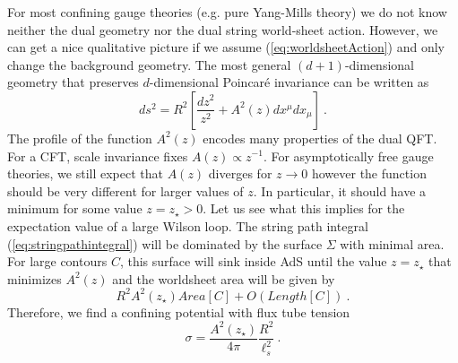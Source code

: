 \documentclass{ws-rv9x6}
\newcommand\be{\begin{equation}}
\newcommand\ee{\end{equation}}
\begin{document}
For most confining gauge theories (e.g. pure Yang-Mills theory) we
do not know neither the dual geometry nor the dual string world-sheet
action. However, we can get a nice qualitative picture if we assume
(\ref{eq:worldsheetAction}) and only change the background geometry.
The most general $(d+1)$-dimensional geometry that preserves $d$-dimensional
Poincaré invariance can be written as
\begin{equation}
ds^{2}=R^{2}\left[\frac{dz^{2}}{z^{2}}+A^{2}(z)dx^{\mu}dx_{\mu}\right]\ .\label{eq:confininggeometry}
\end{equation}
The profile of the function $A^{2}(z)$ encodes many properties of
the dual QFT. For a CFT, scale invariance fixes $A(z)\propto z^{-1}$.
For asymptotically free gauge theories, we still expect that $A(z)$
diverges for $z\to0$ however the function should be very different
for larger values of $z$. In particular, it should have a minimum
for some value $z=z_{\star}>0$. Let us see what this implies for
the expectation value of a large Wilson loop. The string path integral
(\ref{eq:stringpathintegral}) will be dominated by the surface $\Sigma$
with minimal area. For large contours $C$, this surface will sink
inside AdS until the value $z=z_{\star}$ that minimizes $A^{2}(z)$
and the worldsheet area will be given by 
\be
R^{2}A^{2}(z_{\star})Area[C]+O(Length[C])\ .
\ee
Therefore, we find a confining potential with flux tube tension
\be
\sigma=\frac{A^{2}(z_{\star})}{4\pi}\frac{R^{2}}{\ell_{s}^{2}}\ .
\ee
\end{document}
